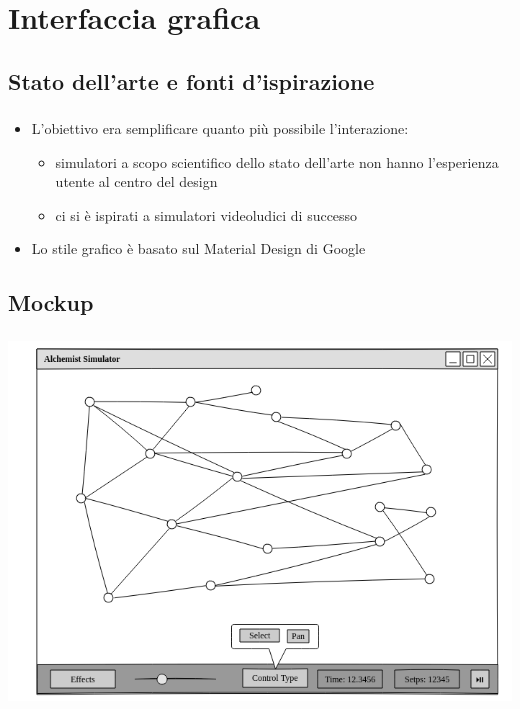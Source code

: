 \documentclass[%
]{beamer}
\begin{document}
    \section{Interfaccia grafica}\label{sec:mockup}
        \subsection{Stato dell'arte e fonti d'ispirazione}\label{subsec:sota}
            \begin{frame}
                \frametitle{\insertsection}
                \framesubtitle{\insertsubsection}

                \begin{itemize}[<+->]
                    \item
                        L'obiettivo era semplificare quanto più possibile l'interazione:
                        \begin{itemize}[<+->]
                            \item
                                simulatori a scopo scientifico dello stato dell'arte non hanno l'esperienza utente al centro del design
                            \item
                                ci si è ispirati a simulatori videoludici di successo
                        \end{itemize}
                    \item
                        Lo stile grafico è basato sul Material Design di Google
                \end{itemize}
            \end{frame}

        \subsection{Mockup}\label{subsec:mockup}
            \begin{frame}
                \frametitle{\insertsection}
                \framesubtitle{\insertsubsection}
                \centering
                \includegraphics[scale=0.415]{mock/withNodes/window}
            \end{frame}
\end{document}
